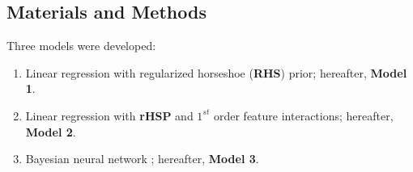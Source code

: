 \documentclass[a0,portrait]{a0poster}
\begin{document}
\begin{multicols}{2}
\section*{Materials and Methods}
Three models were developed:
\begin{enumerate}
    \item Linear regression with regularized horseshoe  (\textbf{RHS}) prior\cite{Vehtari:2017b}; hereafter, \textbf{Model 1}.
    \item Linear regression with \textbf{rHSP} and $1^{st}$ order feature interactions; hereafter, \textbf{Model 2}.
    \item Bayesian neural network \cite{Neal:1996bnn}; hereafter, \textbf{Model 3}.
\end{enumerate}



\end{multicols}
\end{document}
